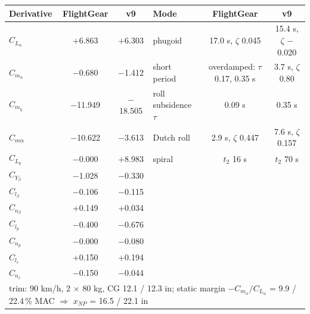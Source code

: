 \begin{tabular}{lcc@{\hspace{2em}}lcc}
\toprule
Derivative & FlightGear & v9 & Mode & FlightGear & v9 \\
\midrule
$C_{L_\alpha}$ & +6.863 & +6.303 & phugoid & 17.0 s, $\zeta$ 0.045 & 15.4 s, $\zeta$ $-$0.020 \\
$C_{m_\alpha}$ & $-$0.680 & $-$1.412 & short period & overdamped: $\tau$ 0.17, 0.35 s & 3.7 s, $\zeta$ 0.80 \\
$C_{m_q}$ & $-$11.949 & $-$18.505 & roll subsidence $\tau$ & 0.09 s & 0.35 s \\
$C_{m\dot\alpha}$ & $-$10.622 & $-$3.613 & Dutch roll & 2.9 s, $\zeta$ 0.447 & 7.6 s, $\zeta$ 0.157 \\
$C_{L_q}$ & $-$0.000 & +8.983 & spiral & $t_2$ 16 s & $t_2$ 70 s \\
$C_{Y_\beta}$ & $-$1.028 & $-$0.330 &  &  &  \\
$C_{l_\beta}$ & $-$0.106 & $-$0.115 &  &  &  \\
$C_{n_\beta}$ & +0.149 & +0.034 &  &  &  \\
$C_{l_p}$ & $-$0.400 & $-$0.676 &  &  &  \\
$C_{n_p}$ & $-$0.000 & $-$0.080 &  &  &  \\
$C_{l_r}$ & +0.150 & +0.194 &  &  &  \\
$C_{n_r}$ & $-$0.150 & $-$0.044 &  &  &  \\
\midrule
\multicolumn{6}{l}{trim: 90 km/h, 2 $\times$ 80 kg, CG 12.1 / 12.3 in; static margin $-C_{m_\alpha}/C_{L_\alpha}$ = 9.9 / 22.4\,\% MAC $\Rightarrow$ $x_{NP}$ = 16.5 / 22.1 in}\\
\bottomrule
\end{tabular}
